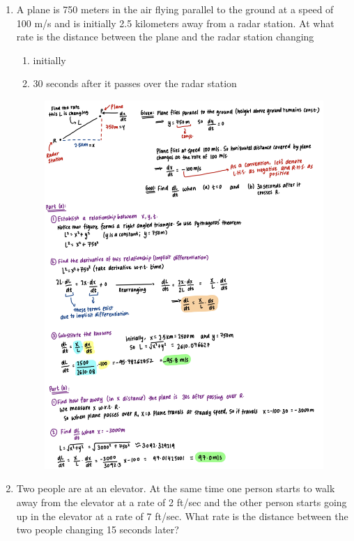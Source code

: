 \documentclass{article}
\begin{document}
\begin{enumerate}
    \pagebreak
    \item A plane is 750 meters in the air flying parallel to the ground at a speed of 100 m/s and is initially 2.5 kilometers away from a radar station. At what rate is the distance between the plane and the radar station changing 
    \begin{enumerate}
        \item initially
        \item 30 seconds after it passes over the radar station 
    \end{enumerate}
     \begin{figure}[H]
        \centering
        \includegraphics[width=0.85\linewidth]{Q2.jpg}
        \label{fig:Q2}
    \end{figure}
    \pagebreak
    \item Two people are at an elevator. At the same time one person starts to walk away from the elevator at a rate of 2 ft/sec and the other person starts going up in the elevator at a rate of 7 ft/sec. What rate is the distance between the two people changing 15 seconds later?
     \begin{figure}[H]
        \centering

\end{figure}
\end{enumerate}
\end{document}

